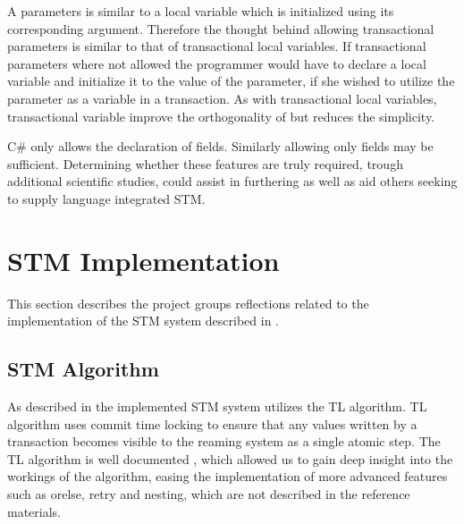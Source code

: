 A parameters is similar to a local variable which is initialized using its corresponding argument\cite[p. 76]{sestoft2011c}. Therefore the thought behind allowing transactional parameters is similar to that of transactional local variables. If transactional parameters where not allowed the programmer would have to declare a  local variable and initialize it to the value of the parameter, if she wished to utilize the parameter as a variable in a transaction. As with transactional local variables, transactional variable improve the orthogonality of \stmname but reduces the simplicity.

C\# only allows the declaration of  fields. Similarly allowing only  fields may be sufficient. Determining whether these features are truly required, trough additional scientific studies, could assist in furthering \stmname as well as aid others seeking to supply language integrated \ac{STM}. 


\section{STM Implementation}\label{sec:reflection_stm_implementation}
This section describes the project groups reflections related to the implementation of the \ac{STM} system described in .

\subsection{STM Algorithm}
As described in  the implemented \ac{STM} system utilizes the TL algorithm\cite{dice2006transactional}. TL algorithm uses commit time locking to ensure that any values written by a transaction becomes visible to the reaming system as a single atomic step. The TL algorithm is well documented \cite{dice2006transactional}\cite[p. 438]{herlihy2012art}\cite[p. 106]{harris2010transactional}, which allowed us to gain deep insight into the workings of the algorithm, easing the implementation of more advanced features such as orelse, retry and nesting, which are not described in the reference materials.

